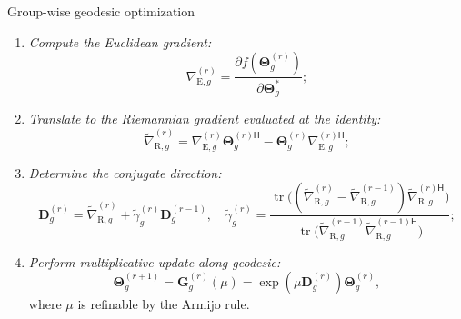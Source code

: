 \documentclass[final,xcolor={table}]{beamer}
\DeclareMathOperator{\tr}{tr}
\newlength{\colwidth}
\begin{document}
\begin{frame}[t]
\begin{columns}[t]
\begin{column}{\colwidth}
\begin{algo}{Group-wise geodesic optimization}{}
				\begin{enumerate}\color{black}
					\item \emph{Compute the Euclidean gradient:}
					\begin{equation*}
						\nabla_{\mathrm{E},g}^{(r)} = \frac{\partial f(\mathbf{\Theta}_g^{(r)})}{\partial \mathbf{\Theta}_g^*};
					\end{equation*}
					\item \emph{Translate to the Riemannian gradient evaluated at the identity:}
					\begin{equation*}
						\tilde{\nabla}_{\mathrm{R},g}^{(r)} = \nabla_{\mathrm{E},g}^{(r)} \mathbf{\Theta}_g^{(r)\mathsf{H}} - \mathbf{\Theta}_g^{(r)} {\nabla_{\mathrm{E},g}^{(r)\mathsf{H}}};
					\end{equation*}
					\item \emph{Determine the conjugate direction:}
					\begin{equation*}
						{\mathbf{D}}_g^{(r)} = \tilde{\nabla}_{\mathrm{R},g}^{(r)} + \tilde{\gamma}_g^{(r)} {\mathbf{D}}_g^{(r-1)}, \quad \tilde{\gamma}_g^{(r)} = \frac{\tr\bigl((\tilde{\nabla}_{\mathrm{R},g}^{(r)} - \tilde{\nabla}_{\mathrm{R},g}^{(r-1)}) {\tilde{\nabla}_{\mathrm{R},g}^{(r)\mathsf{H}}}\bigr)}{\tr\bigl(\tilde{\nabla}_{\mathrm{R},g}^{(r-1)} {\tilde{\nabla}_{\mathrm{R},g}^{(r-1)\mathsf{H}}}\bigr)};
					\end{equation*}
					\item \emph{Perform \textcolor{pink!50!pink!75!black}{multiplicative} update along geodesic:}
					\begin{equation*}
						\mathbf{\Theta}_g^{(r+1)} = \mathbf{G}_g^{(r)}(\mu) = \exp(\mu \mathbf{D}_g^{(r)}) \mathbf{\Theta}_g^{(r)},
					\end{equation*}
					where $\mu$ is refinable by the Armijo rule.
				\end{enumerate}
				\vspace{0.5cm}
			\end{algo}


\end{column}
\end{columns}
\end{frame}
\end{document}
